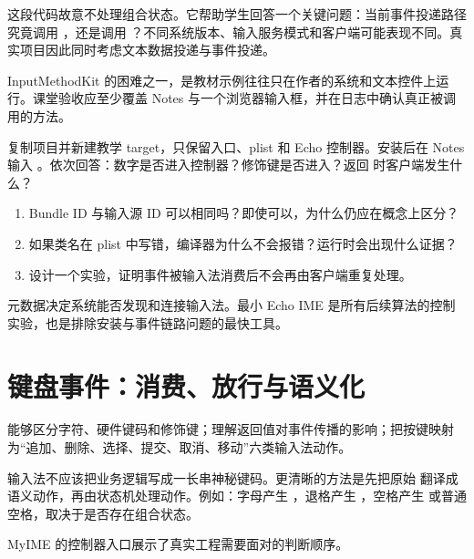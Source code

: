 这段代码故意不处理组合状态。它帮助学生回答一个关键问题：当前事件投递路径究竟调用 ，还是调用 ？不同系统版本、输入服务模式和客户端可能表现不同。真实项目因此同时考虑文本数据投递与事件投递。

\begin{warningbox}
InputMethodKit 的困难之一，是教材示例往往只在作者的系统和文本控件上运行。课堂验收应至少覆盖 Notes 与一个浏览器输入框，并在日志中确认真正被调用的方法。
\end{warningbox}

\begin{lab}[最小输入链路]
复制项目并新建教学 target，只保留入口、plist 和 Echo 控制器。安装后在 Notes 输入 。依次回答：数字是否进入控制器？修饰键是否进入？返回  时客户端发生什么？
\end{lab}

\exercises
\begin{enumerate}
  \item Bundle ID 与输入源 ID 可以相同吗？即使可以，为什么仍应在概念上区分？
  \item 如果类名在 plist 中写错，编译器为什么不会报错？运行时会出现什么证据？
  \item 设计一个实验，证明事件被输入法消费后不会再由客户端重复处理。
\end{enumerate}

\begin{summarybox}
元数据决定系统能否发现和连接输入法。最小 Echo IME 是所有后续算法的控制实验，也是排除安装与事件链路问题的最快工具。
\end{summarybox}


\chapter{键盘事件：消费、放行与语义化}

\begin{goals}
能够区分字符、硬件键码和修饰键；理解返回值对事件传播的影响；把按键映射为“追加、删除、选择、提交、取消、移动”六类输入法动作。
\end{goals}

输入法不应该把业务逻辑写成一长串神秘键码。更清晰的方法是先把原始  翻译成语义动作，再由状态机处理动作。例如：字母产生 ，退格产生 ，空格产生  或普通空格，取决于是否存在组合状态。

MyIME 的控制器入口展示了真实工程需要面对的判断顺序。

